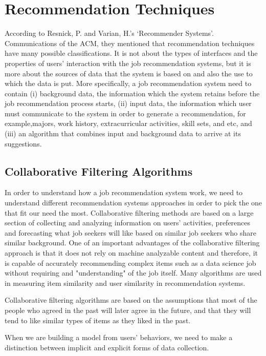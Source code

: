 \documentclass[sigconf]{acmart}
\begin{document}
\section{Recommendation Techniques}
According to Resnick, P. and Varian, H.'s ‘Recommender Systems’. Communications of the ACM, they mentioned that recommendation techniques have many possible classifications. It is not about the types of interfaces and the properties of users' interaction with the job recommendation systems, but it is more about the sources of data that the system is based on and also the use to which the data is put.\cite{Standford} More specifically, a job recommendation system need to contain (i) background data, the information which the system retains before the job recommendation process starts, (ii) input data, the information which user must communicate to the system in order to generate a recommendation, for example,majors, work history, extracurricular activities, skill sets, and etc, and (iii) an algorithm that combines input and background data to arrive at its suggestions.\cite{Standford}



\subsection{Collaborative Filtering Algorithms}
In order to understand how a job recommendation system work, we need to understand different recommendation systems approaches in order to pick the one that fit our need the most. Collaborative filtering methods are based on a large section of collecting and analyzing information on users' activities, preferences and forecasting what job seekers will like based on similar job seekers who share similar background.\cite{CF2017} One of an important advantages of the collaborative filtering approach is that it does not rely on machine analyzable content and therefore, it is capable of accurately recommending complex items such as a data science job without requiring and "understanding" of the job itself.\cite{CF2017} Many algorithms are used in measuring item similarity and user similarity in recommendation systems. 
\par Collaborative filtering algorithms are based on the assumptions that most of the people who agreed in the past will later agree in the future, and that they will tend to like similar types of items as they liked in the past.
\par When we are building a model from users' behaviors, we need to make a distinction between implicit and explicit forms of data collection.
\end{document}
